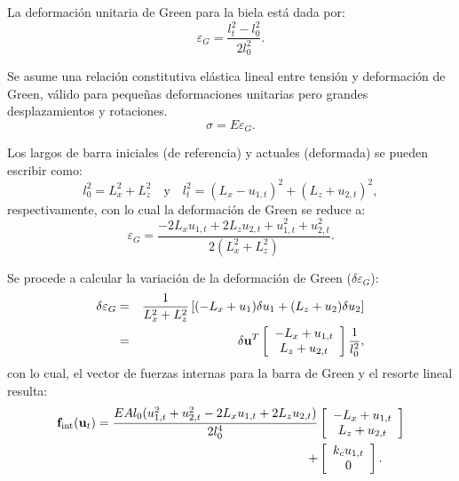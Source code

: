 La deformación unitaria de Green para la biela está dada por:
%
\begin{equation}
\varepsilon_G = \frac{l_t^2 - l_0^2}{2 l_0^2}.
\end{equation}

Se asume una relación constitutiva elástica lineal entre tensión y deformación de Green, válido para pequeñas deformaciones unitarias pero grandes desplazamientos y rotaciones.
%
\begin{equation}
\sigma = E \varepsilon_G.
\end{equation}

Los largos de barra iniciales (de referencia) y actuales (deformada) se pueden escribir como:
%
\begin{equation}
l_0 ^2 = L_x^2+ L_z^2 \quad \text{y} \quad 
l_t ^2 = (L_x-u_{1,t})^2+ (L_z+u_{2,t})^2,
\end{equation}
respectivamente, con lo cual la deformación de Green se reduce a:
%
\begin{equation}
\varepsilon_G = \frac{-2 L_x u_{1,t}+2 L_z u_{2,t} + u_{1,t}^2 + u_{2,t}^2}{2 (L_x^2+L_z^2)}.
\end{equation}

Se procede a calcular la variación de la deformación de Green ($\delta \varepsilon_G$):
%
\begin{eqnarray}
	\delta \varepsilon_G &=& \dfrac{1}{L_x^2+L_z^2}\left[ (-L_x + u_1)\delta u_1 + (L_z+u_2)\delta u_2 \right] \\
	 &=& \delta{\bf u}^T  \left[\begin{array}{c} -L_x + u_{1,t}\\ L_z + u_{2,t}\end{array}\right] \dfrac{1}{l_0^2},
\end{eqnarray}
con lo cual, el vector de fuerzas internas para la barra de Green y el resorte lineal resulta:
%
\begin{equation}
\begin{split}
	{\bf f}_{\text{int}}({\bf u}_t) = \dfrac{E A l_0(u_{1,t}^2 + u_{2,t}^2 -2 L_x u_{1,t}+2 L_z u_{2,t})}{2 l_0^4} &\left[\begin{array}{c} -L_x + u_{1,t}\\ L_z + u_{2,t}\end{array}\right] \\ +& \left[\begin{array}{c} k_c u_{1,t}\\ 0\end{array}\right].
\end{split}
\end{equation}

